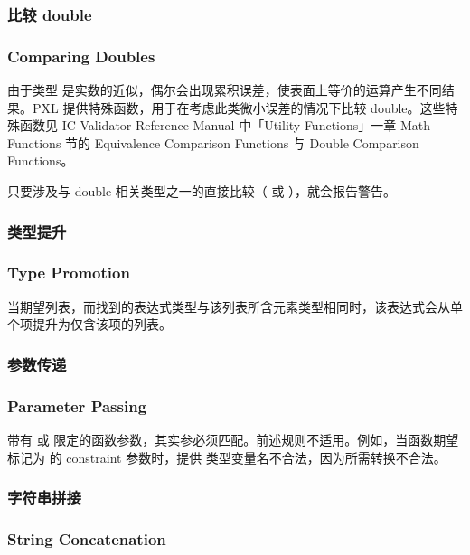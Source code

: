 \subsubsection{比较 double}
\subsubsection*{Comparing Doubles}

由于类型  是实数的近似，偶尔会出现累积误差，使表面上等价的运算产生不同结果。PXL 提供特殊函数，用于在考虑此类微小误差的情况下比较 double。这些特殊函数见 IC Validator Reference Manual 中「Utility Functions」一章 Math Functions 节的 Equivalence Comparison Functions 与 Double Comparison Functions。

\begin{noteBox}
只要涉及与 double 相关类型之一的直接比较（\cmd{==} 或 \cmd{!=}），就会报告警告。
\end{noteBox}

\subsubsection{类型提升}
\subsubsection*{Type Promotion}

当期望列表，而找到的表达式类型与该列表所含元素类型相同时，该表达式会从单个项提升为仅含该项的列表。

\subsubsection{参数传递}
\subsubsection*{Parameter Passing}

带有  或  限定的函数参数，其实参必须匹配。前述规则不适用。例如，当函数期望标记为  的 constraint 参数时，提供  类型变量名不合法，因为所需转换不合法。

\subsubsection{字符串拼接}
\subsubsection*{String Concatenation}

